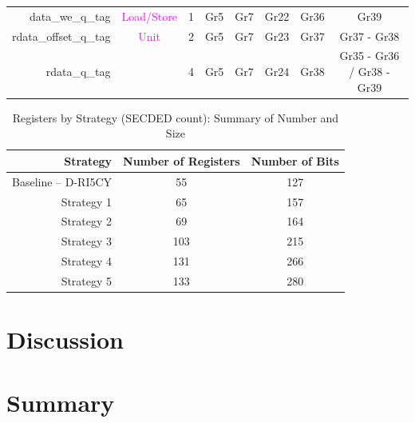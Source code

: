 \begin{table}[t]
\begin{tabular}{@{}rccccccc@{}}
        data\_we\_q\_tag                & \textcolor{magenta}{Load/Store}       & 1      & Gr5                         & Gr7                         & Gr22                        & Gr36                        & Gr39                        \\
        rdata\_offset\_q\_tag           & \textcolor{magenta}{Unit}             & 2      & Gr5                         & Gr7                         & Gr23                        & Gr37                        & Gr37 - Gr38                 \\
        rdata\_q\_tag                   &                                       & 4      & Gr5                         & Gr7                         & Gr24                        & Gr38                        & Gr35 - Gr36 / Gr38 - Gr39   \\
        \bottomrule
    \end{tabular}
\end{table}


\begin{table}[t]
    \centering
    \footnotesize
    \caption{Registers by Strategy (SECDED count): Summary of Number and Size}
    \label{tab:strategies_summary}
    \begin{tabular}{rcc}
        \toprule
        Strategy            & Number of Registers & Number of Bits \\
        \midrule
        Baseline -- D-RI5CY & 55                  & 127            \\
        Strategy 1          & 65                  & 157            \\
        Strategy 2          & 69                  & 164            \\
        Strategy 3          & 103                 & 215            \\
        Strategy 4          & 131                 & 266            \\
        Strategy 5          & 133                 & 280            \\
        \bottomrule
    \end{tabular}
\end{table}


\section{Discussion}
\label{section:chap6_discussion}

\section{Summary}


